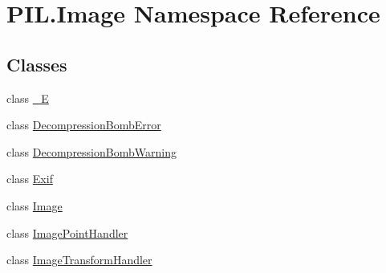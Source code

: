 \hypertarget{namespacePIL_1_1Image}{}\section{P\+I\+L.\+Image Namespace Reference}
\label{namespacePIL_1_1Image}
\subsection*{Classes}
\begin{DoxyCompactItemize}
\item 
class \hyperlink{classPIL_1_1Image_1_1__E}{\+\_\+E}
\item 
class \hyperlink{classPIL_1_1Image_1_1DecompressionBombError}{Decompression\+Bomb\+Error}
\item 
class \hyperlink{classPIL_1_1Image_1_1DecompressionBombWarning}{Decompression\+Bomb\+Warning}
\item 
class \hyperlink{classPIL_1_1Image_1_1Exif}{Exif}
\item 
class \hyperlink{classPIL_1_1Image_1_1Image}{Image}
\item 
class \hyperlink{classPIL_1_1Image_1_1ImagePointHandler}{Image\+Point\+Handler}
\item 
class \hyperlink{classPIL_1_1Image_1_1ImageTransformHandler}{Image\+Transform\+Handler}
\end{DoxyCompactItemize}
